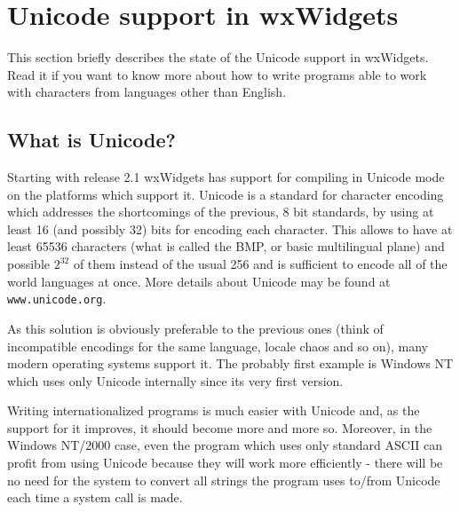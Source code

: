 
\section{Unicode support in wxWidgets}\label{unicode}

This section briefly describes the state of the Unicode support in wxWidgets.
Read it if you want to know more about how to write programs able to work with
characters from languages other than English.

\subsection{What is Unicode?}\label{whatisunicode}

Starting with release 2.1 wxWidgets has support for compiling in Unicode mode
on the platforms which support it. Unicode is a standard for character
encoding which addresses the shortcomings of the previous, 8 bit standards, by
using at least 16 (and possibly 32) bits for encoding each character. This
allows to have at least 65536 characters (what is called the BMP, or basic
multilingual plane) and possible $2^{32}$ of them instead of the usual 256 and
is sufficient to encode all of the world languages at once. More details about
Unicode may be found at {\tt www.unicode.org}.


As this solution is obviously preferable to the previous ones (think of
incompatible encodings for the same language, locale chaos and so on), many
modern operating systems support it. The probably first example is Windows NT
which uses only Unicode internally since its very first version.

Writing internationalized programs is much easier with Unicode and, as the
support for it improves, it should become more and more so. Moreover, in the
Windows NT/2000 case, even the program which uses only standard ASCII can profit
from using Unicode because they will work more efficiently - there will be no
need for the system to convert all strings the program uses to/from Unicode
each time a system call is made.

